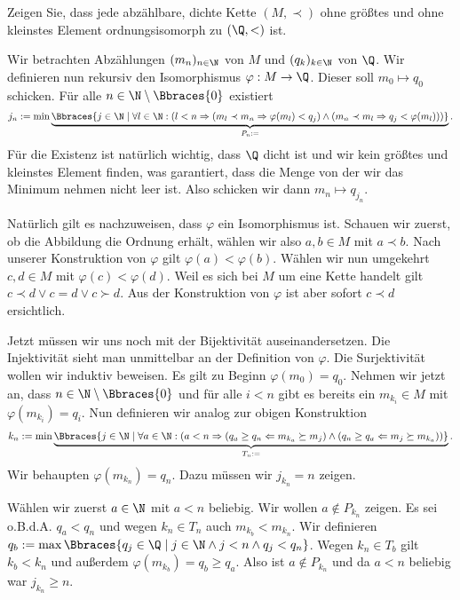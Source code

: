 \begin{exercise}
    Zeigen Sie, dass jede abzählbare, dichte Kette $(M, \prec)$ ohne größtes und ohne kleinstes Element ordnungsisomorph zu $(\Q, <)$ ist.
\end{exercise}
\begin{solution}
    Wir betrachten Abzählungen $(m_n)_{n \in \N}$ von $M$ und $(q_k)_{k \in \N}$ von $\Q$. Wir definieren nun rekursiv den Isomorphismus $\varphi: M \to \Q$. Dieser soll $m_0 \mapsto q_0$ schicken. Für alle $n \in \N \setminus \Bbraces{0}$ existiert
    \begin{align*}
        j_n := \min\underbrace{\Bbraces{j \in \N \mid \forall l \in \N: (l < n \Rightarrow (m_l \prec m_n \Rightarrow \varphi(m_l) < q_j) \land (m_n \prec m_l \Rightarrow q_j < \varphi(m_l) ) )}}_{P_n :=}.
    \end{align*}
     Für die Existenz ist natürlich wichtig, dass $\Q$ dicht ist und wir kein größtes und kleinstes Element finden, was garantiert, dass die Menge von der wir das Minimum nehmen nicht leer ist. Also schicken wir dann $m_n \mapsto q_{j_n}$.
    
    Natürlich gilt es nachzuweisen, dass $\varphi$ ein Isomorphismus ist. Schauen wir zuerst, ob die Abbildung die Ordnung erhält, wählen wir also $a,b \in M$ mit $a \prec b$. Nach unserer Konstruktion von $\varphi$ gilt $\varphi(a) < \varphi(b)$. Wählen wir nun umgekehrt $c,d \in M$ mit $\varphi(c) < \varphi(d)$. Weil es sich bei $M$ um eine Kette handelt gilt $c \prec d \lor c = d \lor c \succ d$. Aus der Konstruktion von $\varphi$ ist aber sofort $c \prec d$ ersichtlich. 

    Jetzt müssen wir uns noch mit der Bijektivität auseinandersetzen. Die Injektivität sieht man unmittelbar an der Definition von $\varphi$. Die Surjektivität wollen wir induktiv beweisen. Es gilt zu Beginn $\varphi(m_0) = q_0$. Nehmen wir jetzt an, dass $n \in \N \setminus \Bbraces{0}$ und für alle $i < n$ gibt es bereits ein $m_{k_i} \in M$ mit $\varphi(m_{k_i}) = q_i$. Nun definieren wir analog zur obigen Konstruktion
    \begin{align*}
        k_n :=  \min\underbrace{\Bbraces{j \in \N \mid \forall a \in \N: (a < n \Rightarrow (q_a \geq q_n \Leftarrow m_{k_a} \succeq m_j) \land (q_n \geq q_a \Leftarrow m_j \succeq m_{k_a} ) )}}_{T_n:=} .
    \end{align*}
    Wir behaupten $\varphi(m_{k_n}) = q_n$. Dazu müssen wir $j_{k_n} = n$ zeigen. 

    Wählen wir zuerst $a \in \N$ mit $a < n$ beliebig. Wir wollen $a \notin P_{k_n}$ zeigen. Es sei o.B.d.A. $q_a < q_n$ und wegen $k_n \in T_n$ auch $m_{k_b} < m_{k_n}$.  Wir definieren $q_b := \max\Bbraces{q_j \in \Q \mid j \in \N \land j < n \land q_j < q_n}$. Wegen $k_n \in T_{b}$ gilt $k_b < k_n$ und außerdem $\varphi(m_{k_b}) = q_b \geq q_a$. Also ist $a \notin P_{k_n}$ und da $a < n$ beliebig war $j_{k_n} \geq n$. 
    

\end{solution}
